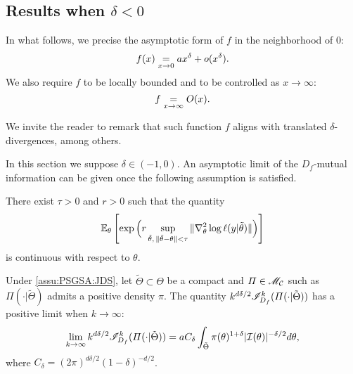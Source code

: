 \subsection{Results when $\delta<0$}

In what follows, we precise the asymptotic form of $f$ in the neighborhood of $0$:
    \begin{equation}
        f(x) \overset{}{\underset{x\rightarrow0}{=}} a x^\delta + o(x^\delta).
    \end{equation}
We also require $f$ to be locally bounded and to be controlled as $x\to\infty$: 
\begin{equation}
    f\overset{}{\underset{x\rightarrow\infty}{=}}O(x).
\end{equation}

We invite the reader to remark that such function $f$ aligns with translated $\delta$-divergences, among others.

In this section we suppose $\delta\in(-1,0)$. 
An asymptotic limit of the $D_f$-mutual information can be given once the following assumption is satisfied.
\begin{assu}
    \label{assu:PSGSA:JDS}
        There exist $\tau>0$ and $r>0$ such that the quantity 
            \begin{equation}
                \mathbb{E}_\theta\left[\exp\Big(r\sup_{\tilde\theta,\,\|\tilde\theta-\theta\|<\tau}\|\nabla^2_\theta\log\ell(y|\tilde\theta)\|\Big)\right] 
            \end{equation}
        is continuous with respect to  $\theta$. %
    \end{assu}


\begin{thm}
    Under \cref{assu:PSGSA:JDS}, let $\tilde\Theta\subset\Theta$ be a compact and $\varPi\in\mathscr{M}_{\mathcal{C}}$ such as $\varPi(\cdot|\tilde\Theta)$ admits a positive density $\pi$. 
    The quantity $k^{d\delta/2}\mathscr{I}^k_{D_f}(\varPi(\cdot|\tilde\Theta))$ has a positive limit when $k\to\infty$:
    \begin{align}
    \label{eq:limitkbeta}
            \lim_{k\rightarrow\infty} k^{d\delta/2} \mathscr{I}^k_{D_f}(\varPi(\cdot|\tilde\Theta)) = 
    a C_\delta \int_{\tilde\Theta}\pi(\theta)^{1+\delta} |\mathcal{I}(\theta)|^{-\delta/2}  d\theta ,
        \end{align}
    where $ C_\delta = (2\pi)^{d\delta/2} (1-\delta)^{-d/2}$. 
    \end{thm}

